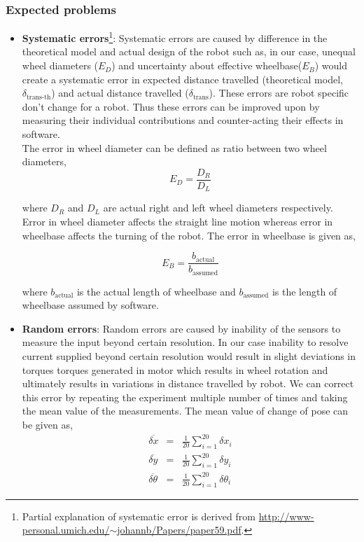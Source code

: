 \subsubsection*{Expected problems}
\begin{itemize}
\item \textbf{Systematic errors}\footnote{Partial explanation of systematic error is derived from \href{http://www-personal.umich.edu/~johannb/Papers/paper59.pdf}{http://www-personal.umich.edu/$\sim$johannb/Papers/paper59.pdf}.}: Systematic errors are caused by difference in the theoretical model and actual design of the robot such as, in our case, unequal wheel diameters ($E_D$) and uncertainty about effective wheelbase($E_B$) would create a systematic error in expected distance travelled (theoretical model, $\delta_{\text{trans-th}}$) and actual distance travelled ($\delta_{\text{trans}}$). These errors are robot specific don't change for a robot. Thus these errors can be improved upon by measuring their individual contributions and counter-acting their effects in software.\\
The error in wheel diameter can be defined as ratio between two wheel diameters,
\begin{equation}
E_D = \frac{D_R}{D_L}
\label{wheel-error}
\end{equation}

where $D_R$ and $D_L$ are actual right and left wheel diameters respectively. Error in wheel diameter affects the straight line motion whereas error in wheelbase affects the turning of the robot. The error in wheelbase is given as,

\begin{equation}
E_B = \frac{b_{\text{actual}}}{b_{\text{assumed}}}
\label{track-width-error}
\end{equation}

where $b_{\text{actual}}$ is the actual length of wheelbase and $b_{\text{assumed}}$ is the length of wheelbase assumed by software.
\item \textbf{Random errors}: Random errors are caused by inability of the sensors to measure the input beyond certain resolution. In our case inability to resolve current supplied beyond certain resolution would result in slight deviations in torques torques generated in motor which results in wheel rotation and ultimately results in variations in distance travelled by robot. We can correct this error by repeating the experiment multiple number of times and taking the mean value of the measurements. The mean value of change of pose can be given as,
\begin{equation}
\begin{array}{rcl}
\overline{\delta x} &=& \frac{1}{20} \sum_{i=1}^{20} \delta x_i \\
\overline{\delta y} &=& \frac{1}{20} \sum_{i=1}^{20} \delta y_i \\
\overline{\delta \theta} &=& \frac{1}{20} \sum_{i=1}^{20} \delta \theta_i
\end{array}
\label{mean-deviation}
\end{equation}


\end{itemize}
